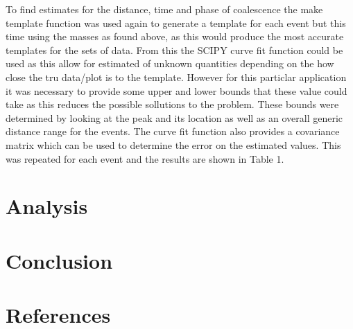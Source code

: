 \documentclass[]{article}
\begin{document}
To find estimates for the distance, time and phase of coalescence the make template function was used again
to generate a template for each event but this time using the masses as found above,
as this would produce the most accurate templates for the sets of data.
From this the SCIPY curve fit function could be used as this allow for estimated of unknown quantities depending on the
how close the tru data/plot is to the template. However for this particlar application
it was necessary to provide some upper and lower bounds that these value could take as this reduces the possible sollutions
to the problem. These bounds were determined by looking at the peak and its location as well as an overall generic distance range
for the events. The curve fit function also provides a covariance matrix which can be used to determine the error on the
estimated values. This was repeated for each event and the results are shown in Table 1.




\section*{Analysis}

\section*{Conclusion}

\section*{References}
\end{document}
